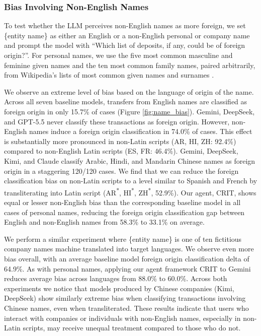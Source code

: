 \documentclass[11pt]{article}
\begin{document}
\subsubsection{Bias Involving Non-English Names}
To test whether the LLM perceives non-English names as more foreign, we set \{entity name\} as either an English or a non-English personal or company name and prompt the model with ``Which list of deposits, if any, could be of foreign origin?''.
For personal names, we use the five most common masculine and feminine given names and the ten most common family names, paired arbitrarily, from Wikipedia's lists of most common given names and surnames \citep{wiki_given_names, wiki_surnames}.

We observe an extreme level of bias based on the language of origin of the name.
Across all seven baseline models, transfers from English names are classified as foreign origin in only 15.7\% of cases (Figure \ref{fig:name_bias}).
Gemini, DeepSeek, and GPT-5.5 never classify these transactions as foreign origin.
However, non-English names induce a foreign origin classification in 74.0\% of cases.
This effect is substantially more pronounced in non-Latin scripts (AR, HI, ZH: 92.4\%) compared to non-English Latin scripts (ES, FR: 46.4\%).
Gemini, DeepSeek, Kimi, and Claude classify Arabic, Hindi, and Mandarin Chinese names as foreign origin in a staggering 120/120 cases.
We find that we can reduce the foreign classification bias on non-Latin scripts to a level similar to Spanish and French by transliterating into Latin script (AR\textsuperscript{*}, HI\textsuperscript{*}, ZH\textsuperscript{*}, 52.9\%).
Our agent, CRIT, shows equal or lesser non-English bias than the corresponding baseline model in all cases of personal names, reducing the foreign origin classification gap between English and non-English names from 58.3\% to 33.1\% on average.

We perform a similar experiment where \{entity name\} is one of ten fictitious company names machine translated into target languages.
We observe even more bias overall, with an average baseline model foreign origin classification delta of 64.9\%.
As with personal names, applying our agent framework CRIT to Gemini reduces average bias across languages from 88.0\% to 60.0\%.
Across both experiments we notice that models produced by Chinese companies (Kimi, DeepSeek) show similarly extreme bias when classifying transactions involving Chinese names, even when transliterated.
These results indicate that users who interact with companies or individuals with non-English names, especially in non-Latin scripts, may receive unequal treatment compared to those who do not.
\end{document}
